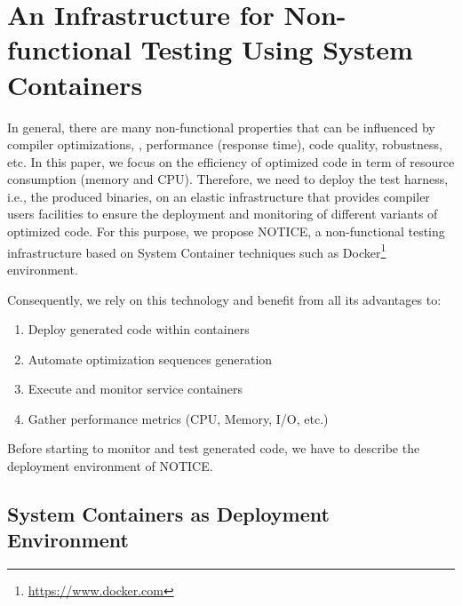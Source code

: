 \section{An Infrastructure for Non-functional Testing Using System Containers}
In general, there are many non-functional properties that can be influenced by compiler optimizations, \eg, performance (response time), code quality, robustness, etc. In this paper, we focus on the efficiency of optimized code in term of resource consumption (memory and CPU).
Therefore, we need to deploy the test harness, i.e., the produced binaries, on an elastic infrastructure that provides compiler users facilities to ensure the deployment and monitoring of different variants of optimized code. 
For this purpose, we propose NOTICE, a non-functional testing infrastructure based on System Container techniques such as Docker\footnote{\url{https://www.docker.com}} environment. 

Consequently, we rely on this technology and benefit from all its advantages to:
\begin{enumerate}
	\item Deploy generated code within containers
	\item Automate optimization sequences generation
	\item Execute and monitor service containers
	\item Gather performance metrics (CPU, Memory, I/O, etc.)
\end{enumerate}


Before starting to monitor and test generated code, we have to describe the deployment environment of NOTICE.
\subsection{System Containers as Deployment Environment}

